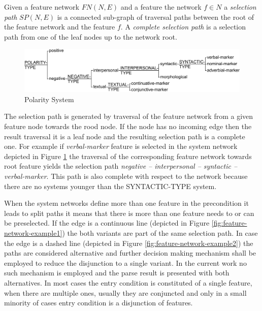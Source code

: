 
Given a feature network $FN(N,E)$ and a feature the network $f \in N$ a \textit{selection path} $SP(N,E)$ is a connected sub-graph of traversal paths between the root of the feature network and the feature $f$. A \textit{complete selection path} is a selection path from one of the leaf nodes up to the network root. 

\begin{figure}[!ht]
    \centering
    \includegraphics[width=\textwidth]{Figures/SFL-grammar/polarity-system.pdf}
    \caption{Polarity System}
    \label{fig:polarity1}
\end{figure}

The selection path is generated by traversal of the feature network from a given feature node towards the rood node. If the node has no incoming edge then the result traversal it is a leaf node and the resulting selection path is a complete one. For example if \textit{verbal-marker} feature is selected in the system network depicted in Figure \ref{fig:polarity1} the traversal of the corresponding feature network towards root feature yields the selection path \textit{negative -- interpersonal -- syntactic -- verbal-marker}. This path is also complete with respect to the network because there are no systems younger than the SYNTACTIC-TYPE system.

When the system networks define more than one feature in the precondition it leads to split paths it means that there is more than one feature needs to or can be preselected. If the edge is a continuous line (depicted  in Figure \ref{fig:feature-network-example1}) the both variants are part of the same selection path. In case the edge is a dashed line (depicted  in Figure \ref{fig:feature-network-example2}) the paths are considered alternative and further decision making mechanism shall be employed to reduce the disjunction to a single variant. In the current work no such mechanism is employed and the parse result is presented with both alternatives. In most cases the entry condition is constituted of a single feature, when there are multiple ones, usually they are conjuncted and only in a small minority of cases entry condition is a disjunction of features.

